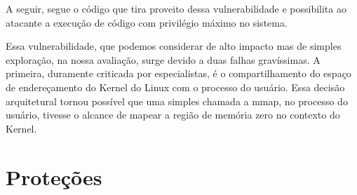 	
			A seguir, segue o código que tira proveito dessa vulnerabilidade e possibilita ao atacante
			a execução de código com privilégio máximo no sistema.  
			

			
			Essa vulnerabilidade, que podemos considerar de alto impacto mas de simples exploração,
			na nossa avaliação, surge devido a duas falhas gravíssimas.
			A primeira, duramente criticada por especialistas, é o compartilhamento do espaço de endereçamento
			do Kernel do Linux com o processo do usuário. Essa decisão arquitetural
			tornou possível que uma simples chamada a mmap, no processo do usuário, tivesse o alcance de
			mapear a região de memória zero no contexto do Kernel. 
		

	\section{Proteções}
